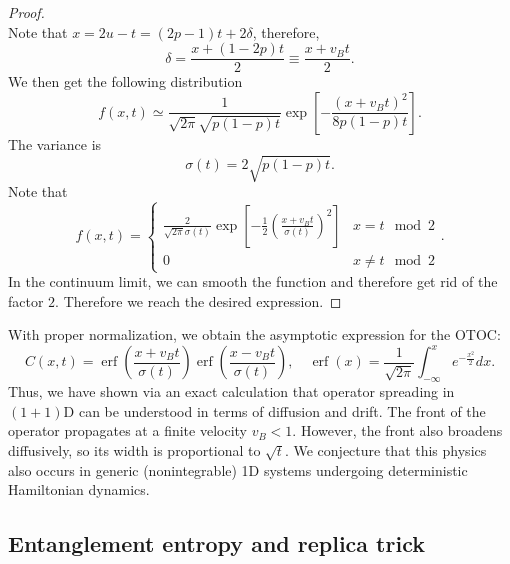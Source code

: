 \documentclass{SciPost}
\begin{document}
\begin{proof}
\begin{equation*}
\end{equation*}
Note that $x=2u-t=(2p-1)t+2\delta$, therefore,
\begin{equation*}
	\delta = \frac{x+(1-2p)t}{2} \equiv \frac{x+v_B t}{2}.
\end{equation*}
We then get the following distribution
\begin{equation*}
	f(x,t) \simeq \frac{1}{\sqrt{2\pi }\sqrt{p(1-p)t}} \exp\left[-\frac{(x+v_B t)^2}{8p(1-p)t}\right].
\end{equation*}
The variance is
\begin{equation*}
	\sigma(t)= 2\sqrt{p(1-p)t}.
\end{equation*}
Note that 
\begin{equation*}
	f(x,t) = \begin{cases}
		\frac{2}{\sqrt{2\pi} \sigma(t)} \exp\left[-\frac{1}{2}\left(\frac{x+v_B t}{\sigma(t)}\right)^2\right] & x=t \mod 2 \\
		0 & x\ne t \mod 2
	\end{cases}.
\end{equation*}
In the continuum limit, we can smooth the function and therefore get rid of the factor $2$.
Therefore we reach the desired expression.
\end{proof}

With proper normalization, we obtain the asymptotic expression for the OTOC:
\begin{equation}
	C(x,t) = \operatorname{erf}\left(\frac{x + v_B t}{\sigma(t)}\right) \operatorname{erf}\left(\frac{x - v_B t}{\sigma(t)}\right), \quad
	\operatorname{erf}(x) = \frac{1}{\sqrt{2\pi}} \int_{-\infty}^x e^{-\frac{x^2}{2}} dx.
\end{equation}
Thus, we have shown via an exact calculation that operator spreading in $(1+1)$D can be understood in terms of diffusion and drift. 
The front of the operator propagates at a finite velocity $v_B < 1$. 
However, the front also broadens diffusively, so its width is proportional to $\sqrt{t}$.
We conjecture that this physics also occurs in generic (nonintegrable) 1D systems undergoing deterministic Hamiltonian dynamics. 


\subsection{Entanglement entropy and replica trick}
\end{document}
